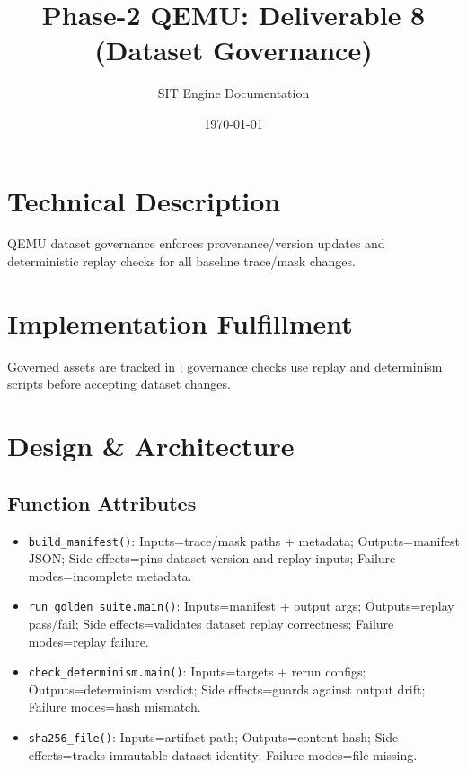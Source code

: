 \documentclass[11pt,a4paper]{article}
\title{Phase-2 QEMU: Deliverable 8 (Dataset Governance)}
\author{SIT Engine Documentation}
\date{\today}
\newcommand{\codepath}[1]{\path{#1}}
\begin{document}
\maketitle

\section{Technical Description}
QEMU dataset governance enforces provenance/version updates and deterministic replay checks for all baseline trace/mask changes.

\section{Implementation Fulfillment}
Governed assets are tracked in \codepath{Phase-2/datasets/}; governance checks use replay and determinism scripts before accepting dataset changes.

\section{Design \& Architecture}
\subsection*{Function Attributes}
\begin{itemize}[leftmargin=*]
  \item \texttt{build\_manifest()}: Inputs=trace/mask paths + metadata; Outputs=manifest JSON; Side effects=pins dataset version and replay inputs; Failure modes=incomplete metadata.
  \item \texttt{run\_golden\_suite.main()}: Inputs=manifest + output args; Outputs=replay pass/fail; Side effects=validates dataset replay correctness; Failure modes=replay failure.
  \item \texttt{check\_determinism.main()}: Inputs=targets + rerun configs; Outputs=determinism verdict; Side effects=guards against output drift; Failure modes=hash mismatch.
  \item \texttt{sha256\_file()}: Inputs=artifact path; Outputs=content hash; Side effects=tracks immutable dataset identity; Failure modes=file missing.
\end{itemize}
\end{document}

